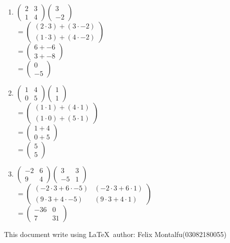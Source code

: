 \documentclass[a4paper]{article}
\begin{document}
\begin{enumerate}[1.]
		\item $\begin{pmatrix}2 & 3 \\ 1 & 4\end{pmatrix}\begin{pmatrix}3 \\ -2\end{pmatrix}$\\
		$=\begin{pmatrix}(2 \cdot 3) + (3 \cdot -2) \\ (1 \cdot 3)+(4 \cdot -2)\end{pmatrix}$\\
		$=\begin{pmatrix}6 + -6 \\ 3 + -8\end{pmatrix}$\\
		$=\begin{pmatrix}0 \\ -5\end{pmatrix}$

		\item $\begin{pmatrix}1 & 4 \\ 0 & 5\end{pmatrix}\begin{pmatrix}1 \\ 1\end{pmatrix}$\\
		$=\begin{pmatrix}(1 \cdot 1)+(4 \cdot 1) \\ (1 \cdot 0) + (5 \cdot 1)\end{pmatrix}$\\
		$=\begin{pmatrix}1+4\\0+5\end{pmatrix}$\\
		$=\begin{pmatrix}5 \\ 5\end{pmatrix}$

		\item $\begin{pmatrix}-2 & 6 \\ 9 & 4\end{pmatrix}\begin{pmatrix}3 & 3 \\ -5 & 1\end{pmatrix}$\\
		$=\begin{pmatrix}(-2 \cdot 3 + 6 \cdot -5) & (-2 \cdot 3 + 6 \cdot 1) \\ (9 \cdot 3 + 4 \cdot -5) & (9 \cdot 3 + 4 \cdot 1)\end{pmatrix}$\\
		$=\begin{pmatrix}-36 & 0 \\ 7 & 31\end{pmatrix}$
	\end{enumerate}
	This document write using \LaTeX \ author: Felix Montalfu(03082180055) 
\end{document}
